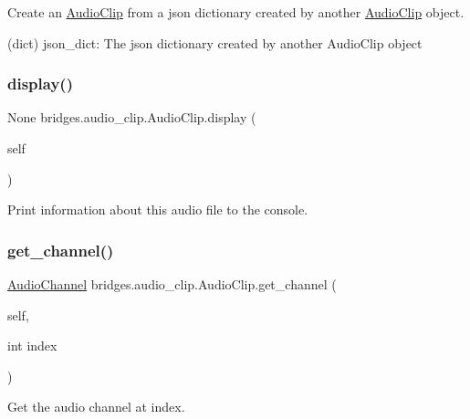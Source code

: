Create an \mbox{\hyperlink{classbridges_1_1audio__clip_1_1_audio_clip}{Audio\+Clip}} from a json dictionary created by another \mbox{\hyperlink{classbridges_1_1audio__clip_1_1_audio_clip}{Audio\+Clip}} object. 

\begin{DoxyVerb}       (dict) json_dict: The json dictionary created by another AudioClip object
\end{DoxyVerb}
 \mbox{\label{classbridges_1_1audio__clip_1_1_audio_clip_a725fd735d019d3103e72fd70ca41017c}} 
\subsubsection{\texorpdfstring{display()}{display()}}
{\footnotesize\ttfamily  None bridges.\+audio\+\_\+clip.\+Audio\+Clip.\+display (\begin{DoxyParamCaption}\item[{}]{self }\end{DoxyParamCaption})}



Print information about this audio file to the console. 

\mbox{\label{classbridges_1_1audio__clip_1_1_audio_clip_ac7fb49132209d4d581fff3009ba73c0f}} 
\subsubsection{\texorpdfstring{get\_channel()}{get\_channel()}}
{\footnotesize\ttfamily  \mbox{\hyperlink{classbridges_1_1audio__channel_1_1_audio_channel}{Audio\+Channel}} bridges.\+audio\+\_\+clip.\+Audio\+Clip.\+get\+\_\+channel (\begin{DoxyParamCaption}\item[{}]{self,  }\item[{int}]{index }\end{DoxyParamCaption})}



Get the audio channel at index. 

